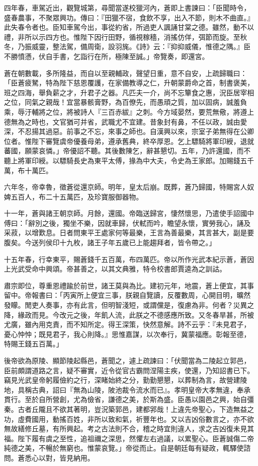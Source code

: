 \begin{pinyinscope}
四年春，車駕近出，觀覽城第，尋聞當遂校獵河內，蒼即上書諫曰：「臣聞時令，盛春農事，不聚眾興功。傳曰：『田獵不宿，食飲不享，出入不節，則木不曲直。』此失春令者也。臣知車駕今出，事從約省，所過吏人諷誦甘棠之德。雖然，動不以禮，非所以示四方也。惟陛下因行田野，循視稼穡，消搖仿佯，弭節而旋。至秋冬，乃振威靈，整法駕，備周衛，設羽旄。《詩》云：『抑抑威儀，惟德之隅。』臣不勝憤懣，伏自手書，乞詣行在所，極陳至誠。」帝覽奏，即還宮。

蒼在朝數載，多所隆益，而自以至親輔政，聲望日重，意不自安，上疏歸職曰：「臣蒼疲駑，特為陛下慈恩覆護，在家備教導之仁，升朝蒙爵命之首，制書褒美，班之四海，舉負薪之才，升君子之器。凡匹夫一介，尚不忘簞食之惠，況臣居宰相之位，同氣之親哉！宜當暴骸膏野，為百僚先，而愚頑之質，加以固病，誠羞負乘，辱汙輔將之位，將被詩人『三百赤紱』之刺。今方域晏然，要荒無儆，將遵上德無為之時也，文官猶可并省，武職尤不宜建。昔象封有鼻，不任以政，誠由愛深，不忍揚其過惡。前事之不忘，來事之師也。自漢興以來，宗室子弟無得在公卿位者。惟陛下審覽虞帝優養母弟，遵承舊典，終卒厚恩。乞上驃騎將軍印綬，退就蕃國，願蒙哀憐。」帝優詔不聽。其後數陳乞，辭甚懇切。五年，乃許還國，而不聽上將軍印綬。以驃騎長史為東平太傅，掾為中大夫，令史為王家郎。加賜錢五千萬，布十萬匹。

六年冬，帝幸魯，徵蒼從還京師。明年，皇太后崩。既葬，蒼乃歸國，特賜宮人奴婢五百人，布二十五萬匹，及珍寶服御器物。

十一年，蒼與諸王朝京師。月餘，還國。帝臨送歸宮，悽然懷思，乃遣使手詔國中傅曰：「辭別之後，獨坐不樂，因就車歸，伏軾而吟，瞻望永懷，實勞我心，誦及采菽，以增歎息。日者問東平王處家何等最樂，王言為善最樂，其言甚大，副是要腹矣。今送列侯印十九枚，諸王子年五歲已上能趨拜者，皆令帶之。」

十五年春，行幸東平，賜蒼錢千五百萬，布四萬匹。帝以所作光武本紀示蒼，蒼因上光武受命中興頌。帝甚善之，以其文典雅，特令校書郎賈逵為之訓詁。

肅宗即位，尊重恩禮踰於前世，諸王莫與為比。建初元年，地震，蒼上便宜，其事留中。帝報書曰：「丙寅所上便宜三事，朕親自覽讀，反覆數周，心開目明，曠然發矇。閒吏人奏事，亦有此言，但明智淺短，或謂儻是，復慮為非。何者？災異之降，緣政而見。今改元之後，年飢人流，此朕之不德感應所致。又冬春旱甚，所被尤廣，雖內用克責，而不知所定。得王深策，快然意解。詩不云乎：『未見君子，憂心忡忡；既見君子，我心則降。』思惟嘉謀，以次奉行，冀蒙福應。彰報至德，特賜王錢五百萬。」

後帝欲為原陵、顯節陵起縣邑，蒼聞之，遽上疏諫曰：「伏聞當為二陵起立郭邑，臣前頗謂道路之言，疑不審實，近令從官古霸問涅陽主疾，使還，乃知詔書已下。竊見光武皇帝躬履儉約之行，深睹始終之分，勤勤懇懇，以葬制為言，故營建陵地，具稱古典，詔曰『無為山陵，陂池裁令流水而已』。孝明皇帝大孝無違，奉承貫行。至於自所營創，尤為儉省，謙德之美，於斯為盛。臣愚以園邑之興，始自彊秦。古者丘隴且不欲其著明，豈況築郭邑，建都郛哉！上違先帝聖心，下造無益之功，虛費國用，動搖百姓，非所以致和氣，祈豐年也。又以吉凶俗數言之，亦不欲無故繕修丘墓，有所興起。考之古法則不合，稽之時宜則違人，求之吉凶復未見其福。陛下履有虞之至性，追祖禰之深思，然懼左右過議，以累聖心。臣蒼誠傷二帝純德之美，不暢於無窮也。惟蒙哀覽。」帝從而止。自是朝廷每有疑政，輒驛使諮問。蒼悉心以對，皆見納用。


\end{pinyinscope}
